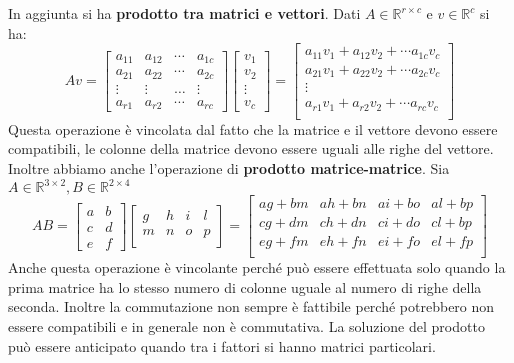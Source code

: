 In aggiunta si ha \textbf{prodotto tra matrici e vettori}. Dati $A\in \mathbb{R}^{r\times c}$
e $v\in \mathbb{R}^{c}$ si ha:
\begin{equation*}
    Av = \left[\begin{array}{cccc}
            a_{11} & a_{12} & \cdots & a_{1c} \\
            a_{21} & a_{22} & \cdots & a_{2c} \\
            \vdots & \vdots & \dots  & \vdots \\
            a_{r1} & a_{r2} & \cdots & a_{rc}
        \end{array}\right] \left[\begin{array}{c}
            v_1 \\v_2\\\vdots\\v_c
        \end{array}\right] = \left[\begin{array}{c}
            a_{11}v_1+a_{12}v_2+\cdots a_{1c}v_c \\
            a_{21}v_1+a_{22}v_2+\cdots a_{2c}v_c \\
            \vdots                               \\
            a_{r1}v_1+a_{r2}v_2+\cdots a_{rc}v_c \\
        \end{array}\right]
\end{equation*}
Questa operazione è vincolata dal fatto che la matrice e il vettore devono
essere compatibili, le colonne della matrice devono essere uguali alle righe del
vettore. Inoltre abbiamo anche l'operazione di \textbf{prodotto matrice-matrice}.
Sia $A\in \mathbb{R}^{3\times 2}, B\in \mathbb{R}^{2\times 4}$
\begin{equation*}
    AB = \left[\begin{array}{cc}
            a & b \\
            c & d \\
            e & f
        \end{array}\right]\left[\begin{array}{cccc}
            g & h & i & l \\
            m & n & o & p \\
        \end{array}\right] = \left[\begin{array}{cccc}
            ag+bm & ah+bn & ai+bo & al+bp \\
            cg+dm & ch+dn & ci+do & cl+bp \\
            eg+fm & eh+fn & ei+fo & el+fp \\
        \end{array}\right]
\end{equation*}
Anche questa operazione è vincolante perché può essere effettuata solo quando la
prima matrice ha lo stesso numero di colonne uguale al numero di righe della
seconda. Inoltre la commutazione non sempre è fattibile perché potrebbero non
essere compatibili e in generale non è commutativa. La soluzione del prodotto 
può essere anticipato quando tra i fattori si hanno matrici particolari.

